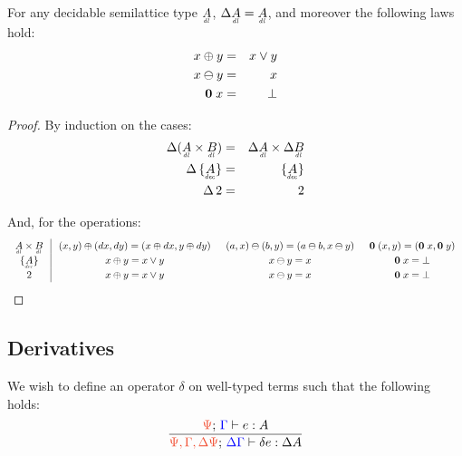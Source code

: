 \documentclass{article}
\newcommand{\longarray}{\renewcommand\arraystretch{1.2}}
\begin{document}
\begin{lemma}\label{lemma:dl-boring}
  For any decidable semilattice type $\eqlat{A}$, $\Ch \eqlat{A} = \eqlat{A}$,
  and moreover the following laws hold:
  \begin{eqnarray*}
    x \oplus y &=& x \vee y\\
    x \ominus y &=& x\\
    \mathbf{0}\; x &=& \bot
  \end{eqnarray*}
\end{lemma}
\begin{proof}
  By induction on the cases:
  \begin{eqnarray*}
    \Ch(\eqlat{A} \x \eqlat{B}) &=& \Ch \eqlat{A} \x \Ch \eqlat{B}\\
    \Ch\thinspace \Seteq{A} &=& \Seteq{A}\\
    \Ch\thinspace \tbool &=& \tbool
  \end{eqnarray*}

  And, for the operations:
  \[\arraycolsep=0.75em\longarray
  \begin{array}{c|ccc}
    \eqlat{A} \x \eqlat{B}
    & (x,y) \oplus (dx,dy) = (x \oplus dx, y \oplus dy)
    & (a,x) \ominus (b,y) = (a \ominus b, x \ominus y)
    & \zero\; (x,y) = (\zero\; x, \zero\; y)\\
    \Set{\eq{A}}
    & x \oplus y = x \vee y
    & x \ominus y = x
    & \zero\;x = \unit\\
    \tbool
    & x \oplus y = x \vee y
    & x \ominus y = x
    & \zero\;x = \unit\\
  \end{array}
  \]
\end{proof}


\subsection{Derivatives}

We wish to define an operator $\delta$ on well-typed terms such that the following holds:
\[
\infer{\J{\GP,\GG,\Ch\GP}{\Ch\GG}{\delta e}{\Ch A}}
      {\J{\GP}{\GG}{e}{A}}
\]
\end{document}
